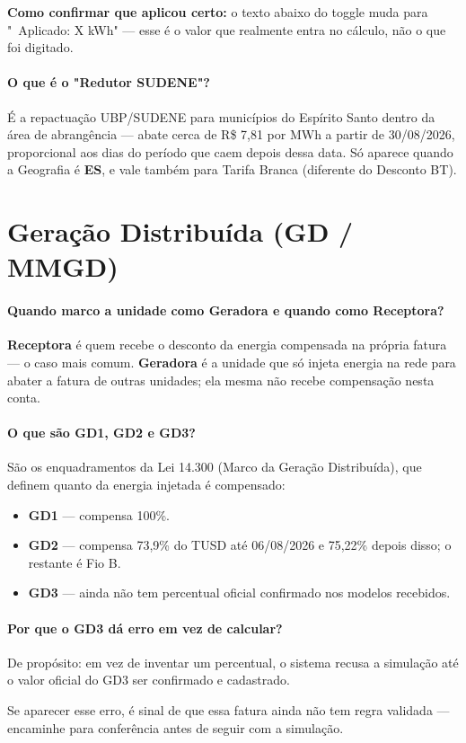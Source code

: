 \documentclass[11pt,a4paper]{article}
\begin{document}
\begin{tipbox}
\textbf{Como confirmar que aplicou certo:} o texto abaixo do toggle muda para "\checkmark\ Aplicado: X kWh" --- esse é o valor que realmente entra no cálculo, não o que foi digitado.
\end{tipbox}

\paragraph{O que é o "Redutor SUDENE"?}
É a repactuação UBP/SUDENE para municípios do Espírito Santo dentro da área de abrangência --- abate cerca de R\$ 7,81 por MWh a partir de 30/08/2026, proporcional aos dias do período que caem depois dessa data. Só aparece quando a Geografia é \textbf{ES}, e vale também para Tarifa Branca (diferente do Desconto BT).

\section{Geração Distribuída (GD / MMGD)}

\paragraph{Quando marco a unidade como Geradora e quando como Receptora?}
\textbf{Receptora} é quem recebe o desconto da energia compensada na própria fatura --- o caso mais comum. \textbf{Geradora} é a unidade que só injeta energia na rede para abater a fatura de outras unidades; ela mesma não recebe compensação nesta conta.

\paragraph{O que são GD1, GD2 e GD3?}
São os enquadramentos da Lei 14.300 (Marco da Geração Distribuída), que definem quanto da energia injetada é compensado:
\begin{itemize}
  \item \textbf{GD1} --- compensa 100\%.
  \item \textbf{GD2} --- compensa 73,9\% do TUSD até 06/08/2026 e 75,22\% depois disso; o restante é Fio B.
  \item \textbf{GD3} --- ainda não tem percentual oficial confirmado nos modelos recebidos.
\end{itemize}

\paragraph{Por que o GD3 dá erro em vez de calcular?}
\begin{critbox}
De propósito: em vez de inventar um percentual, o sistema recusa a simulação até o valor oficial do GD3 ser confirmado e cadastrado.
\end{critbox}
Se aparecer esse erro, é sinal de que essa fatura ainda não tem regra validada --- encaminhe para conferência antes de seguir com a simulação.
\end{document}

